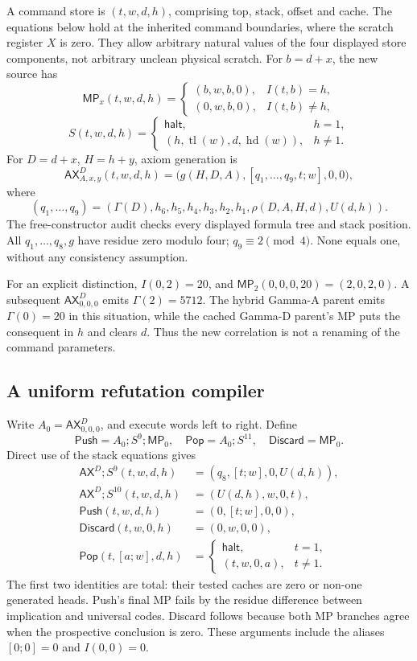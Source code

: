 A command store is $(t,w,d,h)$, comprising top, stack, offset and cache.
The equations below hold at the inherited command boundaries, where the
scratch register $X$ is zero. They allow arbitrary natural values of the
four displayed store components, not arbitrary unclean physical scratch.
For $b=d+x$, the new source has
\[
 \mathsf{MP}_x(t,w,d,h)=
 \begin{cases}(b,w,b,0),&I(t,b)=h,\\(0,w,b,0),&I(t,b)\ne h,\end{cases}
\]
\[
 S(t,w,d,h)=
 \begin{cases}\mathsf{halt},&h=1,\\
 (h,\operatorname{tl}(w),d,\operatorname{hd}(w)),&h\ne1.\end{cases}
\]
For $D=d+x$, $H=h+y$, axiom generation is
\[
 \mathsf{AX}^{D}_{A,x,y}(t,w,d,h)
 =\bigl(g(H,D,A),[q_1,\ldots,q_9,t;w],0,0\bigr),
\]
where
\[
 (q_1,\ldots,q_9)=
 (\Gamma(D),h_6,h_5,h_4,h_3,h_2,h_1,\rho(D,A,H,d),U(d,h)).
\]
The free-constructor audit checks every displayed formula tree and stack
position. All $q_1,\ldots,q_8,g$ have residue zero modulo four;
$q_9\equiv2\pmod4$. None equals one, without any consistency assumption.

For an explicit distinction, $I(0,2)=20$, and
$\mathsf{MP}_2(0,0,0,20)=(2,0,2,0)$. A subsequent
$\mathsf{AX}^{D}_{0,0,0}$ emits $\Gamma(2)=5712$. The hybrid Gamma-A
parent emits $\Gamma(0)=20$ in this situation, while the cached Gamma-D
parent's MP puts the consequent in $h$ and clears $d$. Thus the new
correlation is not a renaming of the command parameters.

\subsection{A uniform refutation compiler}

Write $A_0=\mathsf{AX}^{D}_{0,0,0}$, and execute words left to right.
Define
\[
 \mathsf{Push}=A_0;S^9;\mathsf{MP}_0,\quad
 \mathsf{Pop}=A_0;S^{11},\quad
 \mathsf{Discard}=\mathsf{MP}_0.
\]
Direct use of the stack equations gives
\begin{align*}
 \mathsf{AX}^{D};S^9(t,w,d,h)&=(q_8,[t;w],0,U(d,h)),\\
 \mathsf{AX}^{D};S^{10}(t,w,d,h)&=(U(d,h),w,0,t),\\
 \mathsf{Push}(t,w,d,h)&=(0,[t;w],0,0),\\
 \mathsf{Discard}(t,w,0,h)&=(0,w,0,0),\\
 \mathsf{Pop}(t,[a;w],d,h)&=
 \begin{cases}\mathsf{halt},&t=1,\\(t,w,0,a),&t\ne1.\end{cases}
\end{align*}
The first two identities are total: their tested caches are zero or
non-one generated heads. Push's final MP fails by the residue difference
between implication and universal codes. Discard follows because both MP
branches agree when the prospective conclusion is zero. These arguments
include the aliases $[0;0]=0$ and $I(0,0)=0$.

